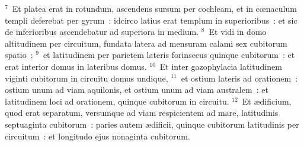 ${}^{7}$~Et platea erat in rotundum, ascendens sursum per cochleam, et in cœnaculum templi deferebat per gyrum~: idcirco latius erat templum in superioribus~: et sic de inferioribus ascendebatur ad superiora in medium.
${}^{8}$~Et vidi in domo altitudinem per circuitum, fundata latera ad mensuram calami sex cubitorum spatio~:
${}^{9}$~et latitudinem per parietem lateris forinsecus quinque cubitorum~: et erat interior domus in lateribus domus.
${}^{10}$~Et inter gazophylacia latitudinem viginti cubitorum in circuitu domus undique,
${}^{11}$~et ostium lateris ad orationem~: ostium unum ad viam aquilonis, et ostium unum ad viam australem~: et latitudinem loci ad orationem, quinque cubitorum in circuitu.
${}^{12}$~Et \ae dificium, quod erat separatum, versumque ad viam respicientem ad mare, latitudinis septuaginta cubitorum~: paries autem \ae dificii, quinque cubitorum latitudinis per circuitum~: et longitudo ejus nonaginta cubitorum.


